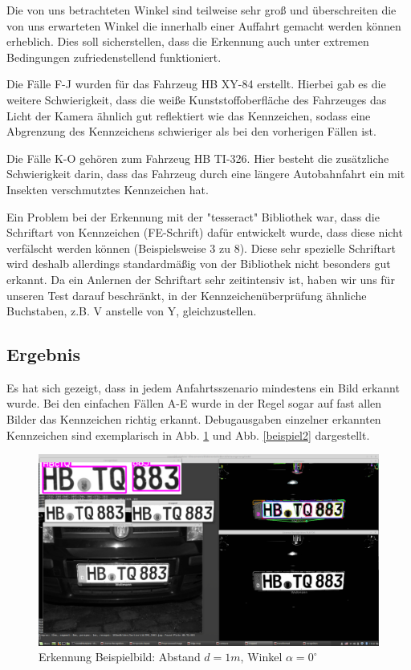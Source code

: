 \documentclass{../Vorlage/sebDenCls}
\begin{document}
Die von uns betrachteten Winkel sind teilweise sehr groß und überschreiten die von uns erwarteten Winkel die innerhalb einer Auffahrt gemacht werden können erheblich. Dies soll sicherstellen, dass die Erkennung auch unter extremen Bedingungen zufriedenstellend funktioniert.

Die Fälle F-J wurden für das Fahrzeug HB XY-84 erstellt. Hierbei gab es die weitere Schwierigkeit, dass die weiße Kunststoffoberfläche des Fahrzeuges das Licht der Kamera ähnlich gut reflektiert wie das Kennzeichen, sodass eine Abgrenzung des Kennzeichens schwieriger als bei den vorherigen Fällen ist.

Die Fälle K-O gehören zum Fahrzeug HB TI-326. Hier besteht die zusätzliche Schwierigkeit darin, dass das Fahrzeug durch eine längere Autobahnfahrt ein mit Insekten verschmutztes Kennzeichen hat.

Ein Problem bei der Erkennung mit der "tesseract" Bibliothek war, dass die Schriftart von Kennzeichen (FE-Schrift) dafür entwickelt wurde, dass diese nicht verfälscht werden können (Beispielsweise 3 zu 8). Diese sehr spezielle Schriftart wird deshalb allerdings standardmäßig von der Bibliothek nicht besonders gut erkannt. Da ein Anlernen der Schriftart sehr zeitintensiv ist, haben wir uns für unseren Test darauf beschränkt, in der Kennzeichenüberprüfung ähnliche Buchstaben, z.B. V anstelle von Y, gleichzustellen.

\subsection{Ergebnis}
Es hat sich gezeigt, dass in jedem Anfahrtsszenario mindestens ein Bild erkannt wurde. Bei den einfachen Fällen A-E wurde in der Regel sogar auf fast allen Bilder das Kennzeichen richtig erkannt.
Debugausgaben einzelner erkannten Kennzeichen sind exemplarisch in Abb. \ref{beispiel} und Abb. \ref{beispiel2} dargestellt.

\begin{figure}[htp]
	\centering 	
	\includegraphics[width=.9\textwidth]{Funktioniert_1962.png} 
	\caption{Erkennung Beispielbild: Abstand $d=1m$, Winkel $\alpha = 0^\circ$ \label{beispiel}}
\end{figure}
\end{document}
